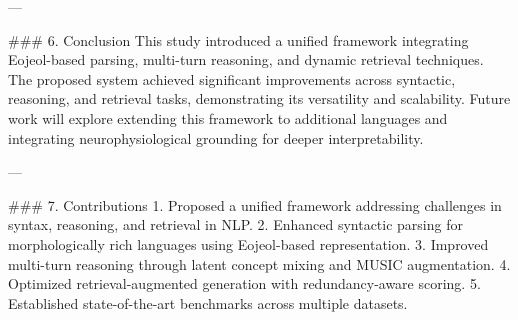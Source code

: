 ---

### 6. Conclusion  
This study introduced a unified framework integrating Eojeol-based parsing, multi-turn reasoning, and dynamic retrieval techniques. The proposed system achieved significant improvements across syntactic, reasoning, and retrieval tasks, demonstrating its versatility and scalability. Future work will explore extending this framework to additional languages and integrating neurophysiological grounding for deeper interpretability.

---

### 7. Contributions  
1. Proposed a unified framework addressing challenges in syntax, reasoning, and retrieval in NLP.  
2. Enhanced syntactic parsing for morphologically rich languages using Eojeol-based representation.  
3. Improved multi-turn reasoning through latent concept mixing and MUSIC augmentation.  
4. Optimized retrieval-augmented generation with redundancy-aware scoring.  
5. Established state-of-the-art benchmarks across multiple datasets.  